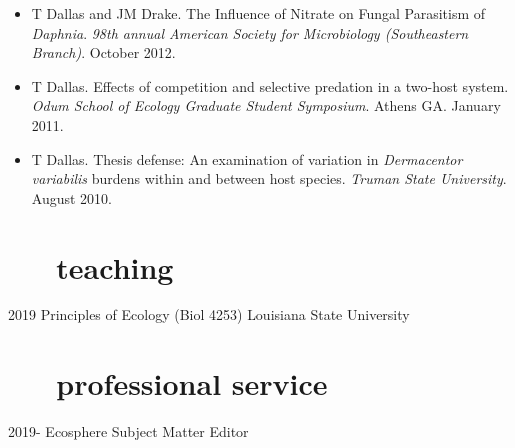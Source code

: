 \documentclass[]{CV}
\begin{document}
\begin{itemize}
\item {\mefont T Dallas} and JM Drake. The Influence of Nitrate on Fungal Parasitism of \textit{Daphnia}. \textit{98th annual American Society for Microbiology (Southeastern Branch)}. October 2012.

\item {\mefont T Dallas}. Effects of competition and selective predation in a two-host system. \textit{Odum School of Ecology Graduate Student Symposium}. Athens GA. January 2011.

\item {\mefont T Dallas}. Thesis defense: An examination of variation in \textit{Dermacentor variabilis} burdens within and between host species. \textit{Truman State University}. August 2010.

\end{itemize}






\section{ \faInstitution \ \ \ teaching}

\begin{entrylist}

  \entry
    {2019}
		{Principles of Ecology (Biol 4253)}
    {Louisiana State University}

\end{entrylist}








\section{ \faUserPlus \ \ \ professional service}

\begin{entrylist}

 \entry
	 {2019-}
	 {Ecosphere}
	 {Subject Matter Editor}


\end{entrylist}
\end{document}
